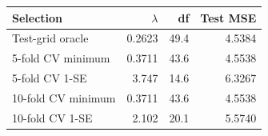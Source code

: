 \begin{center}
\small
\setlength{\tabcolsep}{4pt}
\begin{tabular}{lrrr}
\toprule
Selection & $\lambda$ & df & Test MSE \\
\midrule
Test-grid oracle & 0.2623 & 49.4 & 4.5384 \\
5-fold CV minimum & 0.3711 & 43.6 & 4.5538 \\
5-fold CV 1-SE & 3.747 & 14.6 & 6.3267 \\
10-fold CV minimum & 0.3711 & 43.6 & 4.5538 \\
10-fold CV 1-SE & 2.102 & 20.1 & 5.5740 \\
\bottomrule
\end{tabular}
\end{center}
